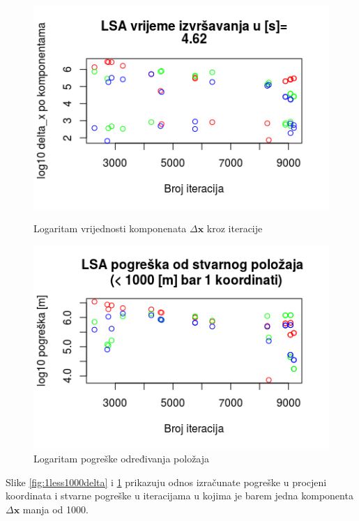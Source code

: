 \documentclass[a4paper,twoside,12pt]{memoir} %
\begin{document}
\begin{figure}[H]
	\begin{minipage}{0.48\textwidth}
		\centering
		\includegraphics[width=1\textwidth]{1less1000delta}
		\caption{Logaritam vrijednosti komponenata $\Delta \mathbf{x}$ kroz iteracije }
		\label{fig:1less1000delta}
	\end{minipage}%
	\hspace{1cm}
	\begin{minipage}{0.48\textwidth}
		\centering
		\includegraphics[width=1\textwidth]{1less1000real}
		\caption{Logaritam pogreške određivanja položaja}
		\label{fig:1less1000real}
	\end{minipage}%
\end{figure}
Slike \ref{fig:1less1000delta} i \ref{fig:1less1000real} prikazuju odnos izračunate pogreške u procjeni koordinata i stvarne pogreške u iteracijama u kojima je barem jedna komponenta $\Delta \mathbf{x}$
manja od 1000.
\end{document}
